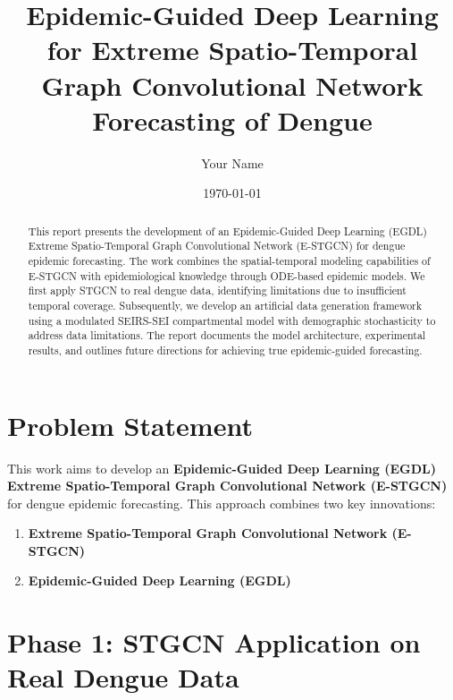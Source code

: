 \documentclass[12pt,a4paper]{article}
\title{Epidemic-Guided Deep Learning for Extreme Spatio-Temporal Graph Convolutional Network Forecasting of Dengue}
\author{Your Name}
\date{\today}
\begin{document}
\maketitle

\begin{abstract}
This report presents the development of an Epidemic-Guided Deep Learning (EGDL) Extreme Spatio-Temporal Graph Convolutional Network (E-STGCN) for dengue epidemic forecasting. The work combines the spatial-temporal modeling capabilities of E-STGCN with epidemiological knowledge through ODE-based epidemic models. We first apply STGCN to real dengue data, identifying limitations due to insufficient temporal coverage. Subsequently, we develop an artificial data generation framework using a modulated SEIRS-SEI compartmental model with demographic stochasticity to address data limitations. The report documents the model architecture, experimental results, and outlines future directions for achieving true epidemic-guided forecasting.
\end{abstract}

\tableofcontents
\newpage

\section{Problem Statement}

This work aims to develop an \textbf{Epidemic-Guided Deep Learning (EGDL) Extreme Spatio-Temporal Graph Convolutional Network (E-STGCN)} for dengue epidemic forecasting. This approach combines two key innovations:

\begin{enumerate}
    \item \textbf{Extreme Spatio-Temporal Graph Convolutional Network (E-STGCN)}

    \item \textbf{Epidemic-Guided Deep Learning (EGDL)}
\end{enumerate}

\section{Phase 1: STGCN Application on Real Dengue Data}
\end{document}
